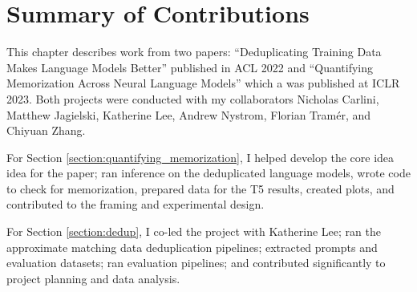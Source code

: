 \section{Summary of Contributions}
This chapter describes work from two papers: ``Deduplicating Training Data Makes Language Models Better'' published in ACL 2022 and ``Quantifying Memorization Across Neural Language Models'' which a was published at ICLR 2023.
Both projects were conducted with my collaborators Nicholas Carlini, Matthew Jagielski, Katherine Lee, Andrew Nystrom, Florian Tram\'er, and Chiyuan Zhang.

For Section \ref{section:quantifying_memorization}, I helped develop the core idea idea for the paper; ran inference on the deduplicated language models, wrote code to check for memorization, prepared data for the T5 results, created plots, and contributed to the framing and experimental design. 

For Section \ref{section:dedup}, I co-led the project with Katherine Lee; ran the approximate matching data deduplication pipelines; extracted prompts and evaluation datasets; ran evaluation pipelines; and contributed significantly to project planning and data analysis.